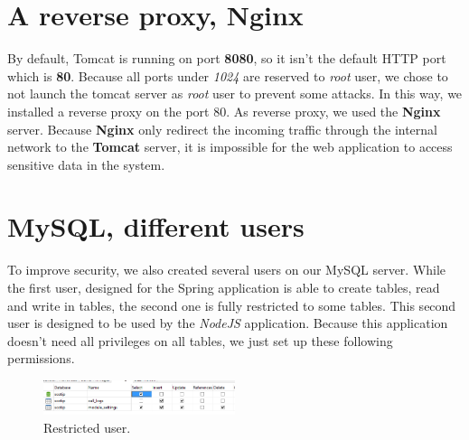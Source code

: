 \section{A reverse proxy, Nginx}

By default, Tomcat is running on port \textbf{8080}, so it isn't the default HTTP port which is \textbf{80}. Because all ports under \textit{1024} are reserved to \textit{root} user, we chose to not launch the tomcat server as \textit{root} user to prevent some attacks. In this way, we installed a reverse proxy on the port 80. As reverse proxy, we used the \textbf{Nginx} server.
Because \textbf{Nginx} only redirect the incoming traffic through the internal network to the \textbf{Tomcat} server, it is impossible for the web application to access sensitive data in the system.

\section{MySQL, different users}
To improve security, we also created several users on our MySQL server. While the first user, designed for the Spring application is able to create tables, read and write in tables, the second one is fully restricted to some tables. This second user is designed to be used by the \textit{NodeJS} application. Because this application doesn't need all privileges on all tables, we just set up these following permissions. 

\begin{figure}[!ht]
  \caption{Restricted user.}
  \centering
    \includegraphics[width=0.5\textwidth]{img/scotipnodespas.png}
\end{figure}

